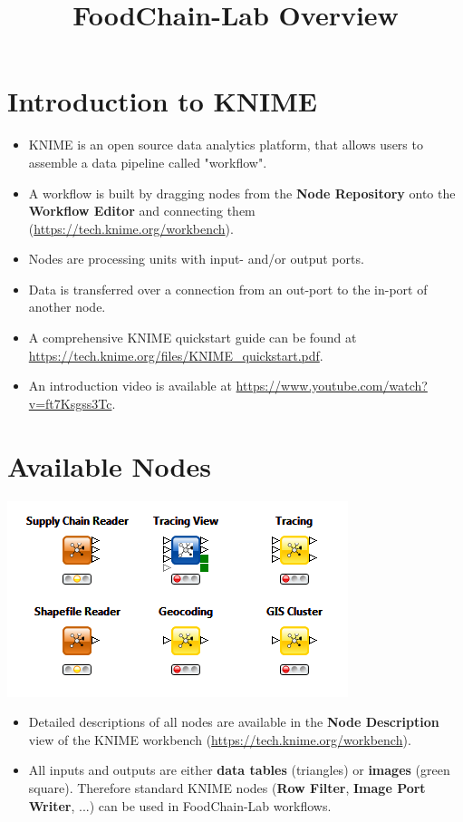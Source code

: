 \documentclass{beamer}
\title{FoodChain-Lab Overview}
\date{}
\begin{document}
\maketitle

\section{Introduction to KNIME}

\begin{frame}
	\begin{itemize}
		\item KNIME is an open source data analytics platform, that allows users to assemble a data pipeline called "workflow".
		\item A workflow is built by dragging nodes from the \textbf{Node Repository} onto the \textbf{Workflow Editor} and connecting them (\url{https://tech.knime.org/workbench}).
		\item Nodes are processing units with input- and/or output ports.
		\item Data is transferred over a connection from an out-port to the in-port of another node.
		\item A comprehensive KNIME quickstart guide can be found at \url{https://tech.knime.org/files/KNIME_quickstart.pdf}.
		\item An introduction video is available at \url{https://www.youtube.com/watch?v=ft7Ksgss3Tc}.
	\end{itemize}
\end{frame}

\section{Available Nodes}
\begin{frame}
	\begin{center}
  		\includegraphics[height=0.4\textheight]{1.png}
	\end{center}
	\begin{itemize}
		\item Detailed descriptions of all nodes are available in the \textbf{Node Description} view of the KNIME workbench (\url{https://tech.knime.org/workbench}).
		\item All inputs and outputs are either \textbf{data tables} (triangles) or \textbf{images} (green square). Therefore standard KNIME nodes (\textbf{Row Filter}, \textbf{Image Port Writer}, ...) can be used in FoodChain-Lab workflows.		
	\end{itemize}
\end{frame}
 
\end{document}
